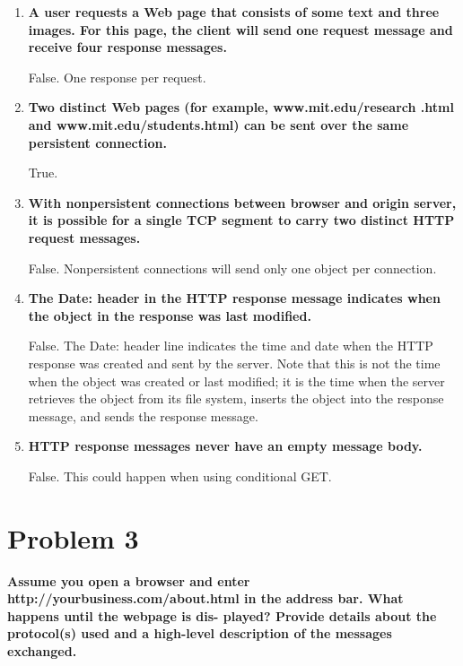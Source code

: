 \documentclass[11pt]{article}
\newenvironment{qparts}{\begin{enumerate}[{(}a{)}]}{\end{enumerate}}
\begin{document}
\begin{qparts}

	\item \textbf{A user requests a Web page that consists of some text and three images. For this page, the client will send one request message and receive four response messages.}
	
	False. One response per request.
	
	\item \textbf{Two distinct Web pages (for example, www.mit.edu/research .html and www.mit.edu/students.html) can be sent over the same persistent connection.}

	True.
	
	\item \textbf{With nonpersistent connections between browser and origin server, it is possible for a single TCP segment to carry two distinct HTTP request messages.}
	
	False. Nonpersistent connections will send only one object per connection.
	
	\item \textbf{The Date: header in the HTTP response message indicates when the object in the response was last modified.}
	
	False. The Date: header line indicates the time and date when the HTTP response was created and sent by the server. Note that this is not the time when the object was created or last modified; it is the time when the server retrieves the object from its file system, inserts the object into the response message, and sends the response message. 
	
	\item \textbf{HTTP response messages never have an empty message body.}

	False. This could happen when using conditional GET.

\end{qparts}


\newpage
\section{Problem 3}

\textbf{Assume you open a browser and enter http://yourbusiness.com/about.html in the address bar. What happens until the webpage is dis- played? Provide details about the protocol(s) used and a high-level description of the messages exchanged.}

~\\
\end{document}
